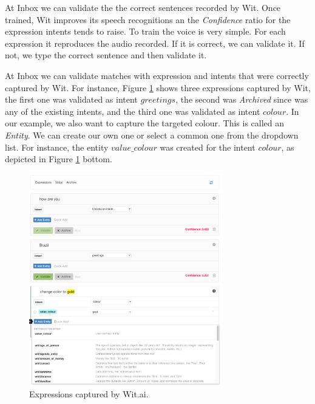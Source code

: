 At Inbox we can validate the the correct sentences recorded by Wit.
Once trained, Wit improves its speech recognitions an the \emph{Confidence} ratio for the expression intents tends to raise.
To train the voice is very simple.
For each expression it reproduces the audio recorded.
If it is correct, we can validate it.
If not, we type the correct sentence and then validate it.



At Inbox we can validate matches with expression and intents that were correctly captured by Wit.
For instance, Figure \ref{fig:expressions} shows three expressions captured by Wit, the first one was validated as intent $greetings$, the second was \emph{Archived} since was any of the existing intents, and the third one was validated as intent $colour$.
In our example, we also want to capture the targeted colour.
This is called an \emph{Entity}. 
We can create our own one or select a common one from the dropdown list. 
For instance, the entity $value\_colour$ was created for the intent $colour$, as depicted in Figure \ref{fig:expressions} bottom.


\begin{figure}[!h]
\begin{center}
    \includegraphics[width=0.75\textwidth]{figures/expressions.png}
    \caption{Expressions captured by Wit.ai.}
    \label{fig:expressions}
\end{center}
\end{figure}

